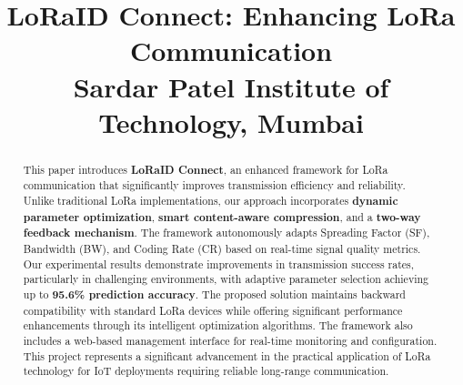 \documentclass[conference]{IEEEtran}
\begin{document}
\title{LoRaID Connect: Enhancing LoRa Communication\\
\large Sardar Patel Institute of Technology, Mumbai}

\author{
\and
{}
}

\maketitle
\begin{abstract}
This paper introduces \textbf{LoRaID Connect}, an enhanced framework for LoRa communication that significantly improves transmission efficiency and reliability. Unlike traditional LoRa implementations, our approach incorporates \textbf{dynamic parameter optimization}, \textbf{smart content-aware compression}, and a \textbf{two-way feedback mechanism}. The framework autonomously adapts Spreading Factor (SF), Bandwidth (BW), and Coding Rate (CR) based on real-time signal quality metrics. Our experimental results demonstrate improvements in transmission success rates, particularly in challenging environments, with adaptive parameter selection achieving up to \textbf{95.6\% prediction accuracy}. The proposed solution maintains backward compatibility with standard LoRa devices while offering significant performance enhancements through its intelligent optimization algorithms. The framework also includes a web-based management interface for real-time monitoring and configuration. This project represents a significant advancement in the practical application of LoRa technology for IoT deployments requiring reliable long-range communication.
\end{abstract}
\end{document}
